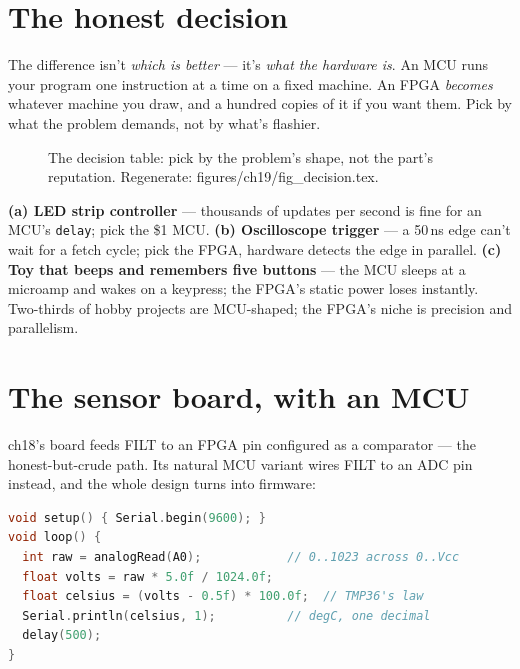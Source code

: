 \section{The honest decision}\label{sec:decision19}

The difference isn't \emph{which is better} --- it's \emph{what the
hardware is}. An MCU runs your program one instruction at a time on
a fixed machine. An FPGA \emph{becomes} whatever machine you draw,
and a hundred copies of it if you want them. Pick by what the
problem demands, not by what's flashier.

\begin{figure}[htbp]
\centering

\caption{The decision table: pick by the problem's shape, not the
part's reputation. Regenerate: \ttfamily
figures/ch19/fig\_decision.tex.}
\label{fig:decision19}
\end{figure}

\begin{example}
\textbf{(a) LED strip controller} --- thousands of updates per second
is fine for an MCU's \texttt{delay}; pick the \$1 MCU. \textbf{(b)
Oscilloscope trigger} --- a 50\,ns edge can't wait for a fetch
cycle; pick the FPGA, hardware detects the edge in parallel.
\textbf{(c) Toy that beeps and remembers five buttons} --- the MCU
sleeps at a microamp and wakes on a keypress; the FPGA's static
power loses instantly. Two-thirds of hobby projects are
MCU-shaped; the FPGA's niche is precision and parallelism.
\end{example}

\section{The sensor board, with an MCU}\label{sec:variant19}

ch18's board feeds FILT to an FPGA pin configured as a comparator
--- the honest-but-crude path. Its natural MCU variant wires FILT
to an ADC pin instead, and the whole design turns into firmware:

\begin{lstlisting}[caption={The sensor board's MCU variant, as an
Arduino sketch (shown, not run here --- the same sketch the docs
publish verbatim).},language=C]
void setup() { Serial.begin(9600); }
void loop() {
  int raw = analogRead(A0);            // 0..1023 across 0..Vcc
  float volts = raw * 5.0f / 1024.0f;
  float celsius = (volts - 0.5f) * 100.0f;  // TMP36's law
  Serial.println(celsius, 1);          // degC, one decimal
  delay(500);
}
\end{lstlisting}

